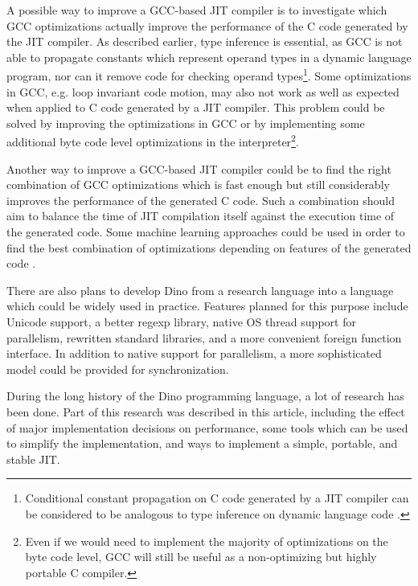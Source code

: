 \documentclass[preprint]{sigplanconf}
\begin{document}
  A possible way to improve a GCC-based JIT compiler is to investigate which
GCC optimizations actually improve the performance of the C code generated by the JIT compiler. As described earlier, type inference is essential, as GCC is not able to
propagate constants which represent operand types in a dynamic language program,
nor can it remove code for checking operand types\footnote{Conditional constant 
propagation on C code generated by a JIT compiler can be considered to be analogous to
type inference on dynamic language code \cite{Morgan} \cite{Muchnick}.}. Some 
optimizations in GCC, e.g. loop invariant code motion, may also not work as well as 
expected when applied to C code generated by a JIT compiler. This problem could be solved 
by improving the optimizations in GCC or by implementing some additional
byte code level optimizations in the interpreter\footnote{Even if we would need to 
implement the majority of optimizations on the byte code level, GCC will still be useful 
as a non-optimizing but highly portable C compiler.}.

  Another way to improve a GCC-based JIT compiler could be to find the
right combination of GCC optimizations which is fast enough but
still considerably improves the performance of the generated C code.
Such a combination should aim to balance the time of JIT compilation itself
against the execution time of the generated code.
Some machine learning approaches could be
used in order to find the best combination of optimizations
depending on features of the generated code \cite{CompilerDesign}.

There are also plans to develop Dino from a research language into a language which could
be widely used in practice. Features planned for this purpose include Unicode support,
a better regexp library, native OS thread support for parallelism,
rewritten standard libraries, and a more convenient foreign function 
interface. In addition to native support for parallelism,
a more sophisticated model could be provided for synchronization.

  During the long history of the Dino programming language, a lot of research
has been done.  Part of this research was described in this article,
including the effect of major implementation decisions on performance,
some tools which can be used to simplify the implementation, and ways to
implement a simple, portable, and stable JIT.
\end{document}
